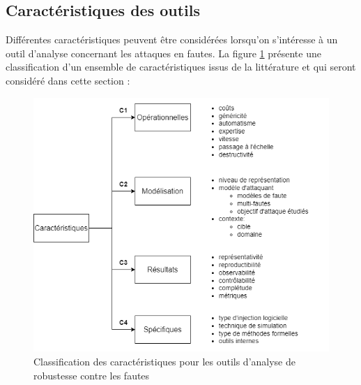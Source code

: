         \subsection{Caractéristiques des outils}
        \label{sec:soa-tools-carac}
     
            Différentes caractéristiques peuvent être considérées lorsqu'on s'intéresse à un outil d'analyse concernant les attaques en fautes.
            La figure \ref{fig:soa-tools-conclusion} présente une classification d'un ensemble de caractéristiques issus de la littérature et qui seront considéré dans cette section :
            
            \begin{figure}[hbt]\centering
              \includegraphics[scale=.55]{ch2-background/img/tools-carac.drawio.png}
              \caption{Classification des caractéristiques pour les outils d'analyse de robustesse contre les fautes}
              \label{fig:soa-tools-conclusion}
            \end{figure}
            
